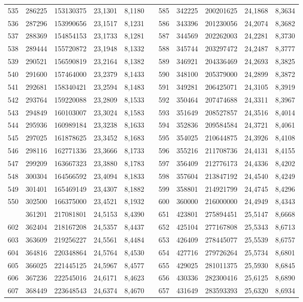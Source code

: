 \begin{longtable}{rrrrrrrrrrr}
535&286225&153130375&23,1301&8,1180&&585&342225&200201625&24,1868&8,3634\\
536&287296&153990656&23,1517&8,1231&&586&343396&201230056&24,2074&8,3682\\
537&288369&154854153&23,1733&8,1281&&587&344569&202262003&24,2281&8,3730\\
538&289444&155720872&23,1948&8,1332&&588&345744&203297472&24,2487&8,3777\\
539&290521&156590819&23,2164&8,1382&&589&346921&204336469&24,2693&8,3825\\
540&291600&157464000&23,2379&8,1433&&590&348100&205379000&24,2899&8,3872\\
541&292681&158340421&23,2594&8,1483&&591&349281&206425071&24,3105&8,3919\\
542&293764&159220088&23,2809&8,1533&&592&350464&207474688&24,3311&8,3967\\
543&294849&160103007&23,3024&8,1583&&593&351649&208527857&24,3516&8,4014\\
544&295936&160989184&23,3238&8,1633&&594&352836&209584584&24,3721&8,4061\\
545&297025&161878625&23,3452&8,1683&&595&354025&210644875&24,3926&8,4108\\
546&298116&162771336&23,3666&8,1733&&596&355216&211708736&24,4131&8,4155\\
547&299209&163667323&23,3880&8,1783&&597&356409&212776173&24,4336&8,4202\\
548&300304&164566592&23,4094&8,1833&&598&357604&213847192&24,4540&8,4249\\
549&301401&165469149&23,4307&8,1882&&599&358801&214921799&24,4745&8,4296\\
550&302500&166375000&23,4521&8,1932&&600&360000&216000000&24,4949&8,4343\\
\newpage
601&361201&217081801&24,5153&8,4390&&651&423801&275894451&25,5147&8,6668\\
602&362404&218167208&24,5357&8,4437&&652&425104&277167808&25,5343&8,6713\\
603&363609&219256227&24,5561&8,4484&&653&426409&278445077&25,5539&8,6757\\
604&364816&220348864&24,5764&8,4530&&654&427716&279726264&25,5734&8,6801\\
605&366025&221445125&24,5967&8,4577&&655&429025&281011375&25,5930&8,6845\\
606&367236&222545016&24,6171&8,4623&&656&430336&282300416&25,6125&8,6890\\
607&368449&223648543&24,6374&8,4670&&657&431649&283593393&25,6320&8,6934\\

\end{longtable}
